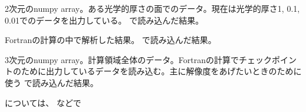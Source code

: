 \documentclass[letterpaper,10pt,dvipdfmx,report]{sphinxmanual}
\begin{document}

\begin{fulllineitems}
\label{\detokenize{io:R2D2.R2D2.qi}}
2次元のnumpy array。ある光学的厚さの面でのデータ。現在は光学的厚さ1, 0.1, 0.01でのデータを出力している。  で読み込んだ結果。

\end{fulllineitems}


\begin{fulllineitems}
\label{\detokenize{io:R2D2.R2D2.vc}}
Fortranの計算の中で解析した結果。  で読み込んだ結果。

\end{fulllineitems}


\begin{fulllineitems}
\label{\detokenize{io:R2D2.R2D2.qc}}
3次元のnumpy array。計算領域全体のデータ。Fortranの計算でチェックポイントのために出力しているデータを読み込む。主に解像度をあげたいときのために使う  で読み込んだ結果。

\end{fulllineitems}


 については、 などで

\begin{sphinxVerbatim}[commandchars=\\\{\}]
   
       \PYG{l+s+s1}{R2D2.p[}\PYG{l+s+s1}{]}
\end{sphinxVerbatim}
\end{document}
